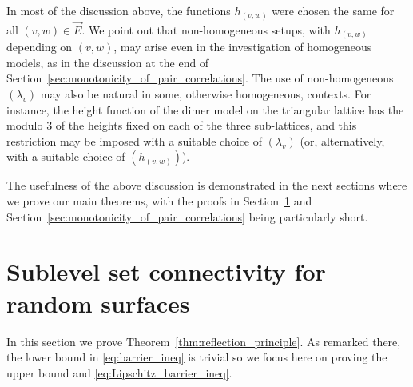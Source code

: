 \documentclass[english]{article}
\theoremstyle{plain}
\theoremstyle{plain}
\begin{document}
\medskip
In most of the discussion above, the functions $h_{(v,w)}$ were chosen
the same for all $(v,w)\in \vec{E}$. We point out that non-homogeneous setups, with $h_{(v,w)}$ depending on $(v,w)$, may arise even in the investigation of homogeneous models, as in the discussion at the end of Section~\ref{sec:monotonicity_of_pair_correlations}. The use of non-homogeneous $(\lambda_v)$ may also be natural in some, otherwise homogeneous, contexts. For instance, the height function of the dimer model on the triangular lattice has the modulo $3$ of the heights fixed on each of the three sub-lattices, and this restriction may be imposed with a suitable choice of $(\lambda_v)$ (or, alternatively, with a suitable choice of $(h_{(v,w)})$).

The usefulness of the above discussion is demonstrated in the next sections where we prove our main theorems, with the proofs in Section~\ref{sec:sublevel_set_connectivity} and Section~\ref{sec:monotonicity_of_pair_correlations} being particularly short.

\section{Sublevel set connectivity for random surfaces}\label{sec:sublevel_set_connectivity}
In this section we prove Theorem~\ref{thm:reflection_principle}. As remarked there, the lower bound in \eqref{eq:barrier_ineq} is trivial so we focus here on
proving the upper bound and \eqref{eq:Lipschitz_barrier_ineq}.
\end{document}
